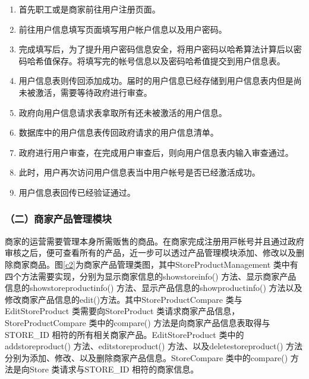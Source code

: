 	\begin{enumerate}
	\item 首先职工或是商家前往用户注册页面。
	\item 前往用户信息填写页面填写用户帐户信息以及用户密码。
	\item 完成填写后，为了提升用户密码信息安全，将用户密码以哈希算法计算后以密码哈希值保存。将填写完的帐号信息以及密码哈希值提交到用户信息表。
	\item 用户信息表则传回添加成功。届时的用户信息已经存储到用户信息表内但是尚未被激活，需要等待政府进行审查。
	\item 政府向用户信息请求表拿取所有还未被激活的用户信息。
	\item 数据库中的用户信息表传回政府请求的用户信息清单。
	\item 政府进行用户审查，在完成用户审查后，则向用户信息表内输入审查通过。
	\item 此时，用户再次访问用户信息表当中用户帐号是否已经激活成功。
	\item 用户信息表回传已经验证通过。
	\end{enumerate}


\subsubsection{（二）商家产品管理模块}
商家的运营需要管理本⾝所需贩售的商品。在商家完成注册⽤⼾帐号并且通过政府审核之后，便可查看所有的产品，近⼀步可以透过产品管理模块添加、修改以及删除商家商品。图\ref{c2}为商家产品管理类图，其中StoreProductManagement 类中有四个⽅法需要实现，分别为显⽰商家信息的showstoreinfo() ⽅法、显⽰商家产品信息的showstoreproductinfo() ⽅法、显⽰产品信息的showproductinfo() 方法以及修改商家产品信息的edit()⽅法。其中StoreProductCompare 类与EditStoreProduct 类需要向StoreProduct 类请求商家产品信息，StoreProductCompare 类中的compare() ⽅法是向商家产品信息表取得与STORE\_ID 相符的所有相关商家产品。EditStoreProduct 类中的addstoreproduct() ⽅法、editstoreproduct() ⽅法、以及deletestoreproduct() ⽅法分别为添加、修改、以及删除商家产品信息。StoreCompare 类中的compare() ⽅法是向Store 类请求与STORE\_ID 相符的商家信息。

